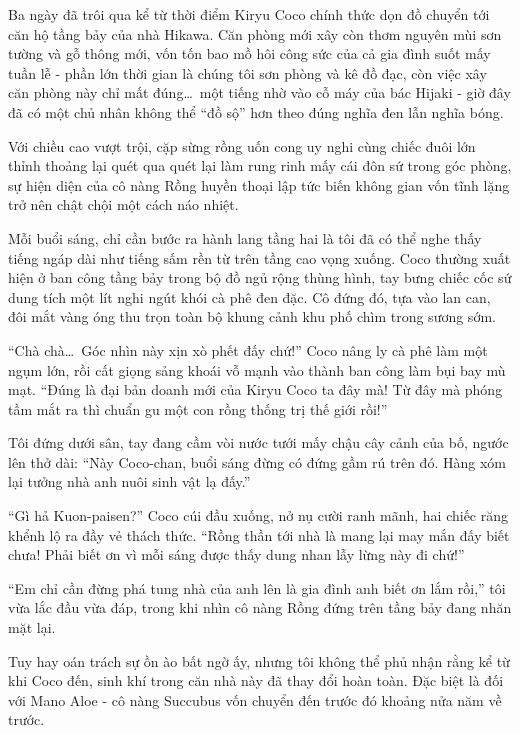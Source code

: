 \documentclass[../main.tex]{subfiles}
\begin{document}

Ba ngày đã trôi qua kể từ thời điểm Kiryu Coco chính thức dọn đồ chuyển tới căn hộ tầng bảy của nhà Hikawa. Căn phòng mới xây còn thơm nguyên mùi sơn tường và gỗ thông mới, vốn tốn bao mồ hôi công sức của cả gia đình suốt mấy tuần lễ - phần lớn thời gian là chúng tôi sơn phòng và kê đồ đạc, còn việc xây căn phòng này chỉ mất đúng\dots\ một tiếng nhờ vào cỗ máy của bác Hijaki - giờ đây đã có một chủ nhân không thể ``đồ sộ'' hơn theo đúng nghĩa đen lẫn nghĩa bóng.

Với chiều cao vượt trội, cặp sừng rồng uốn cong uy nghi cùng chiếc đuôi lớn thỉnh thoảng lại quét qua quét lại làm rung rinh mấy cái đôn sứ trong góc phòng, sự hiện diện của cô nàng Rồng huyền thoại lập tức biến không gian vốn tĩnh lặng trở nên chật chội một cách náo nhiệt.

Mỗi buổi sáng, chỉ cần bước ra hành lang tầng hai là tôi đã có thể nghe thấy tiếng ngáp dài như tiếng sấm rền từ trên tầng cao vọng xuống. Coco thường xuất hiện ở ban công tầng bảy trong bộ đồ ngủ rộng thùng hình, tay bưng chiếc cốc sứ dung tích một lít nghi ngút khói cà phê đen đặc. Cô đứng đó, tựa vào lan can, đôi mắt vàng óng thu trọn toàn bộ khung cảnh khu phố chìm trong sương sớm.

``Chà chà\dots\ Góc nhìn này xịn xò phết đấy chứ!'' Coco nâng ly cà phê làm một ngụm lớn, rồi cất giọng sảng khoái vỗ mạnh vào thành ban công làm bụi bay mù mạt. ``Đúng là đại bản doanh mới của Kiryu Coco ta đây mà! Từ đây mà phóng tầm mắt ra thì chuẩn gu một con rồng thống trị thế giới rồi!''

Tôi đứng dưới sân, tay đang cầm vòi nước tưới mấy chậu cây cảnh của bố, ngước lên thở dài: ``Này Coco-chan, buổi sáng đừng có đứng gầm rú trên đó. Hàng xóm lại tưởng nhà anh nuôi sinh vật lạ đấy.''

``Gì hả Kuon-paisen?'' Coco cúi đầu xuống, nở nụ cười ranh mãnh, hai chiếc răng khểnh lộ ra đầy vẻ thách thức. ``Rồng thần tới nhà là mang lại may mắn đấy biết chưa! Phải biết ơn vì mỗi sáng được thấy dung nhan lẫy lừng này đi chứ!''

``Em chỉ cần đừng phá tung nhà của anh lên là gia đình anh biết ơn lắm rồi,'' tôi vừa lắc đầu vừa đáp, trong khi nhìn cô nàng Rồng đứng trên tầng bảy đang nhăn mặt lại.

Tuy hay oán trách sự ồn ào bất ngờ ấy, nhưng tôi không thể phủ nhận rằng kể từ khi Coco đến, sinh khí trong căn nhà này đã thay đổi hoàn toàn. Đặc biệt là đối với Mano Aloe - cô nàng Succubus vốn chuyển đến trước đó khoảng nửa năm về trước.
\end{document}
